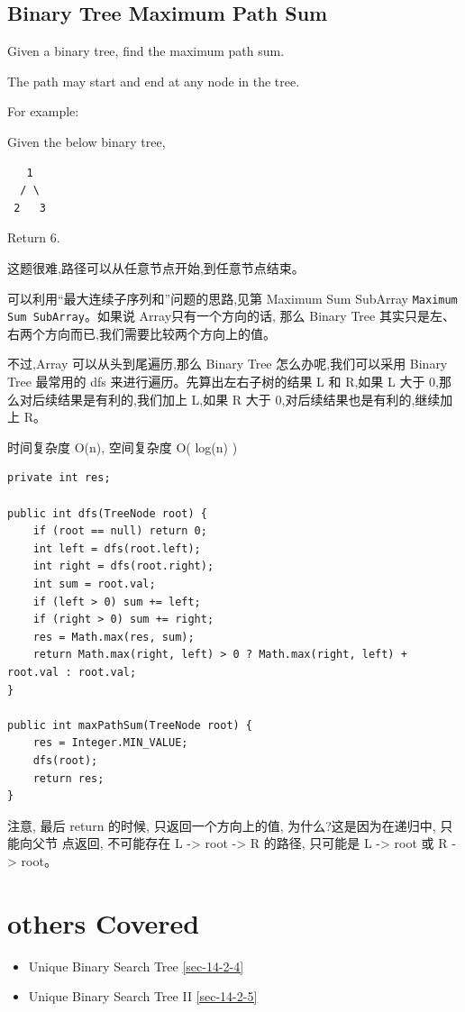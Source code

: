 \documentclass[12pt]{book}
\begin{document}
\subsection{Binary Tree Maximum Path Sum}
\label{sec-4-5-9}
Given a binary tree, find the maximum path sum.

The path may start and end at any node in the tree.

For example:

Given the below binary tree,
\lstset{language=java,label= ,caption= ,numbers=none}
\begin{lstlisting}
   1
  / \
 2   3
\end{lstlisting}

Return 6.

这题很难,路径可以从任意节点开始,到任意节点结束。

可以利用“最大连续子序列和”问题的思路,见第 Maximum Sum SubArray \texttt{Maximum Sum SubArray}。如果说 Array只有一个方向的话, 那么 Binary Tree 其实只是左、右两个方向而已,我们需要比较两个方向上的值。

不过,Array 可以从头到尾遍历,那么 Binary Tree 怎么办呢,我们可以采用 Binary Tree 最常用的 dfs 来进行遍历。先算出左右子树的结果 L 和 R,如果 L 大于 0,那么对后续结果是有利的,我们加上 L,如果 R 大于 0,对后续结果也是有利的,继续加上 R。

时间复杂度 O(n), 空间复杂度 O( log(n) )

\lstset{language=java,label= ,caption= ,numbers=none}
\begin{lstlisting}
private int res;

public int dfs(TreeNode root) {
    if (root == null) return 0;
    int left = dfs(root.left);
    int right = dfs(root.right);
    int sum = root.val;
    if (left > 0) sum += left;
    if (right > 0) sum += right;
    res = Math.max(res, sum);
    return Math.max(right, left) > 0 ? Math.max(right, left) + root.val : root.val;
}
        
public int maxPathSum(TreeNode root) {
    res = Integer.MIN_VALUE;
    dfs(root);
    return res;
}
\end{lstlisting}

注意, 最后 return 的时候, 只返回一个方向上的值, 为什么?这是因为在递归中, 只能向父节
点返回, 不可能存在 L -> root -> R 的路径, 只可能是 L -> root 或 R -> root。

\section{others Covered}
\label{sec-4-6}
\begin{itemize}
\item Unique Binary Search Tree
\ref{sec-14-2-4}
\item Unique Binary Search Tree II
\ref{sec-14-2-5}
\end{itemize}
\end{document}
